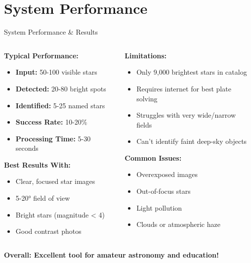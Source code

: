 \documentclass[aspectratio=169]{beamer}
\begin{document}
\section{System Performance}

\begin{frame}{System Performance \& Results}
\begin{columns}
\begin{column}{0.5\textwidth}
\textbf{Typical Performance:}
\begin{itemize}
\item \textbf{Input:} 50-100 visible stars
\item \textbf{Detected:} 20-80 bright spots  
\item \textbf{Identified:} 5-25 named stars
\item \textbf{Success Rate:} 10-20\%
\item \textbf{Processing Time:} 5-30 seconds
\end{itemize}

\textbf{Best Results With:}
\begin{itemize}
\item Clear, focused star images
\item 5-20° field of view
\item Bright stars (magnitude < 4)
\item Good contrast photos
\end{itemize}
\end{column}

\begin{column}{0.5\textwidth}
\textbf{Limitations:}
\begin{itemize}
\item Only 9,000 brightest stars in catalog
\item Requires internet for best plate solving
\item Struggles with very wide/narrow fields
\item Can't identify faint deep-sky objects
\end{itemize}

\textbf{Common Issues:}
\begin{itemize}
\item Overexposed images
\item Out-of-focus stars
\item Light pollution
\item Clouds or atmospheric haze
\end{itemize}
\end{column}
\end{columns}

\vspace{0.5cm}
\textcolor{stargreen}{\textbf{Overall: Excellent tool for amateur astronomy and education!}}
\end{frame}
\end{document}
